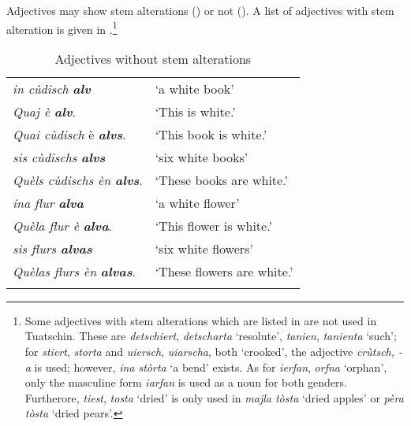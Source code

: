 Adjectives may show stem alterations  () or not (). A list of adjectives with stem alteration is given in .\footnote{Some adjectives with stem alterations which are listed in \citet[282f.]{Spescha1989} are not used in Tuatschin. These are \textit{detschiert}, \textit{detscharta} `resolute', \textit{tanien}, \textit{tanienta} `such'; for \textit{stiert}, \textit{storta} and \textit{uiersch}, \textit{uiarscha}, both `crooked', the adjective \textit{crùtsch, -a} is used; however, \textit{ina stòrta} `a bend' exists. As for \textit{ierfan}, \textit{orfna} `orphan', only the masculine form \textit{iarfan} is used as a noun for both genders. Furtherore, \textit{tiest}, \textit{tosta} `dried' is only used in \textit{majla tòsta} `dried apples' or \textit{pèra tòsta} `dried pears'.}

\begin{table}
\caption{Adjectives without stem alterations}
\label{tab:adj:nostemalterations}
 \begin{tabular}{ll}
  \lsptoprule
 \textit{in cùdisch} \textbf{\textit{alv}} & `a white book'\\
\textit{Quaj è \textbf{alv}}. & `This is white.'\\
\textit{Quai cùdisch} è \textbf{\textit{alvs}}. & `This book is white.'\\
\textit{sis cùdischs} \textbf{\textit{alvs}} & `six white books'\\
\textit{Quèls cùdischs èn} \textbf{\textit{alvs}}. & `These books are white.'\\
\textit{ina flur} \textbf{\textit{alva}} & `a white flower'\\
\textit{Quèla flur è} \textbf{\textit{alva}}. & `This flower is white.'\\
\textit{sis flurs \textbf{alvas}} & `six white flowers'\\
\textit{Quèlas flurs èn} \textbf{\textit{alvas}}. & `These flowers are white.'\\
  \lspbottomrule
 \end{tabular}
\end{table}

